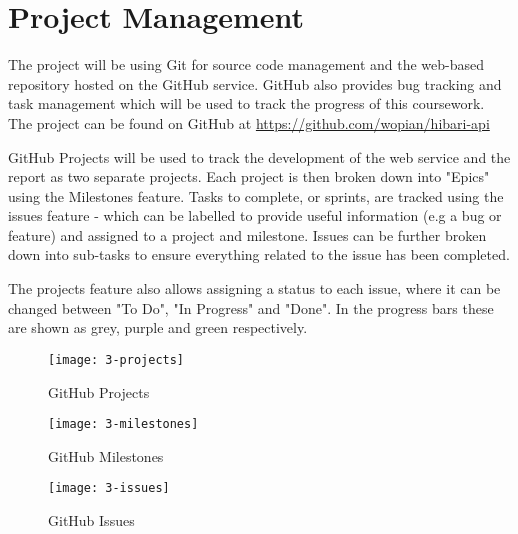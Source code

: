 \chapter{Project Management}

The project will be using Git for source code management and the web-based repository hosted on the GitHub service. GitHub also provides bug tracking and task management which will be used to track the progress of this coursework. The project can be found on GitHub at \url{https://github.com/wopian/hibari-api}

GitHub Projects will be used to track the development of the web service and the report as two separate projects. Each project is then broken down into "Epics" using the Milestones feature. Tasks to complete, or sprints, are tracked using the issues feature - which can be labelled to provide useful information (e.g a bug or feature) and assigned to a project and milestone. Issues can be further broken down into sub-tasks to ensure everything related to the issue has been completed.

The projects feature also allows assigning a status to each issue, where it can be changed between "To Do", "In Progress" and "Done". In the progress bars these are shown as grey, purple and green respectively.

\begin{figure}[H]
  \caption{GitHub Projects}
  \centering
  \texttt{[image: 3-projects]}
\end{figure}

\begin{figure}[H]
  \caption{GitHub Milestones}
  \centering
  \texttt{[image: 3-milestones]}
\end{figure}

\begin{figure}[H]
  \caption{GitHub Issues}
  \centering
  \texttt{[image: 3-issues]}
\end{figure}
